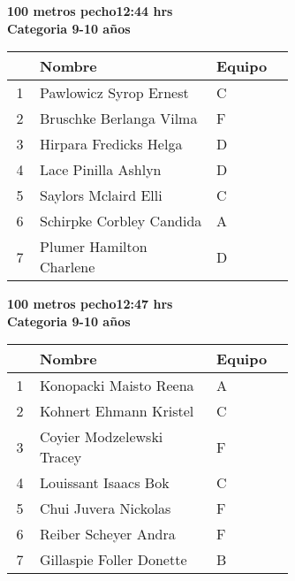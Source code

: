 \begin{minipage}{0.95\linewidth}\vspace{0.5cm} 
\begin{flushleft}
\textbf{
\hspace{-0.15cm}100 metros pecho\hspace{1.5cm}12:44 hrs \\Categoria 9-10 años}\vspace{-0.2cm} 
\end{flushleft}
\begin{tabular}{cp{0.63\linewidth}l}
\hline
& \textbf{Nombre} & \textbf{Equipo} \\ \hline
1 & Pawlowicz Syrop Ernest & C \\ 
2 & Bruschke Berlanga Vilma & F \\ 
3 & Hirpara Fredicks Helga & D \\ 
4 & Lace Pinilla Ashlyn & D \\ 
5 & Saylors Mclaird Elli & C \\ 
6 & Schirpke Corbley Candida & A \\ 
7 & Plumer Hamilton Charlene & D \\ 
\end{tabular}
\end{minipage}
\begin{minipage}{0.95\linewidth}\vspace{0.5cm} 
\begin{flushleft}
\textbf{
\hspace{-0.15cm}100 metros pecho\hspace{1.5cm}12:47 hrs \\Categoria 9-10 años}\vspace{-0.2cm} 
\end{flushleft}
\begin{tabular}{cp{0.63\linewidth}l}
\hline
& \textbf{Nombre} & \textbf{Equipo} \\ \hline
1 & Konopacki Maisto Reena & A \\ 
2 & Kohnert Ehmann Kristel & C \\ 
3 & Coyier Modzelewski Tracey & F \\ 
4 & Louissant Isaacs Bok & C \\ 
5 & Chui Juvera Nickolas & F \\ 
6 & Reiber Scheyer Andra & F \\ 
7 & Gillaspie Foller Donette & B \\ 
\end{tabular}
\end{minipage}
